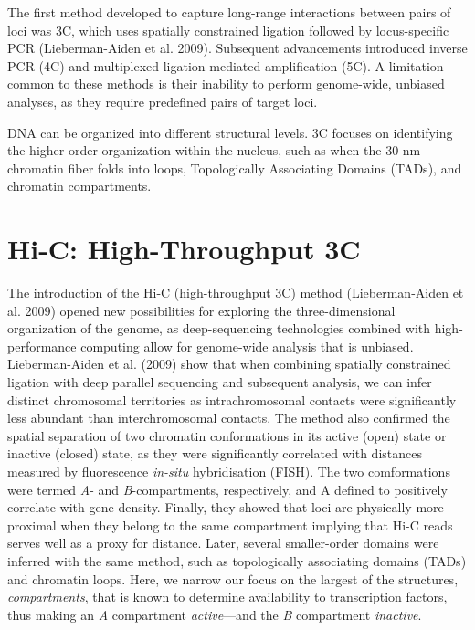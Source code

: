 \documentclass[
  11pt,
  a4paper,
]{scrbook}
\begin{document}
The first method developed to capture long-range interactions between
pairs of loci was 3C, which uses spatially constrained ligation followed
by locus-specific PCR (Lieberman-Aiden et al. 2009). Subsequent
advancements introduced inverse PCR (4C) and multiplexed
ligation-mediated amplification (5C). A limitation common to these
methods is their inability to perform genome-wide, unbiased analyses, as
they require predefined pairs of target loci.

DNA can be organized into different structural levels. 3C focuses on
identifying the higher-order organization within the nucleus, such as
when the 30 nm chromatin fiber folds into loops, Topologically
Associating Domains (TADs), and chromatin compartments.

\section{Hi-C: High-Throughput 3C}\label{hi-c-high-throughput-3c}

The introduction of the Hi-C (high-throughput 3C) method
(Lieberman-Aiden et al. 2009) opened new possibilities for exploring the
three-dimensional organization of the genome, as deep-sequencing
technologies combined with high-performance computing allow for
genome-wide analysis that is unbiased. Lieberman-Aiden et al. (2009)
show that when combining spatially constrained ligation with deep
parallel sequencing and subsequent analysis, we can infer distinct
chromosomal territories as intrachromosomal contacts were significantly
less abundant than interchromosomal contacts. The method also confirmed
the spatial separation of two chromatin conformations in its active
(open) state or inactive (closed) state, as they were significantly
correlated with distances measured by fluorescence \emph{in-situ}
hybridisation (FISH). The two comformations were termed \emph{A}- and
\emph{B}-compartments, respectively, and A defined to positively
correlate with gene density. Finally, they showed that loci are
physically more proximal when they belong to the same compartment
implying that Hi-C reads serves well as a proxy for distance. Later,
several smaller-order domains were inferred with the same method, such
as topologically associating domains (TADs) and chromatin loops. Here,
we narrow our focus on the largest of the structures,
\emph{compartments}, that is known to determine availability to
transcription factors, thus making an \emph{A} compartment
\emph{active}---and the \emph{B} compartment \emph{inactive}.
\end{document}
